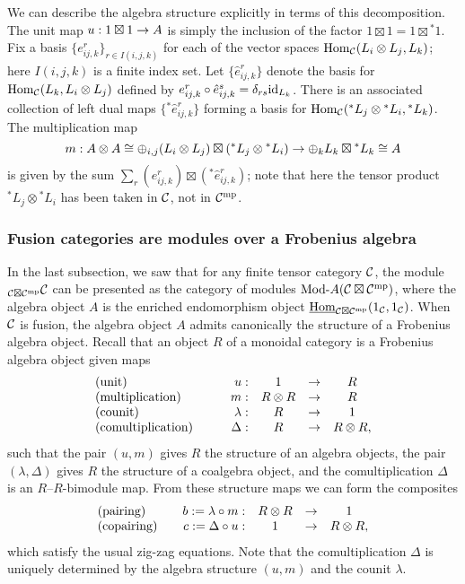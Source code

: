 \documentclass{amsart}
\begin{document}
We can describe the algebra structure explicitly in terms of this decomposition.  The unit map $u: 1 \boxtimes 1 \rightarrow A$ is simply the inclusion of the factor $1 \boxtimes 1 = 1 \boxtimes {}^*1$.  Fix a basis $\{e^r_{ij,k}\}_{r \in I(i,j,k)}$ for each of the vector spaces $\operatorname{Hom}_\mathcal C(L_i \otimes L_j,L_k)$; here $I(i,j,k)$ is a finite index set.  Let $\{\hat{e}^r_{ij,k}\}$ denote the basis for $\operatorname{Hom}_\mathcal C(L_k,L_i \otimes L_j)$ defined by $e^r_{ij,k} \circ \hat{e}^s_{ij,k} = \delta_{rs} \mathrm{id}_{L_k}$.  There is an associated collection of left dual maps $\{{}^*\hat{e}^r_{ij,k}\}$ forming a basis for $\operatorname{Hom}_\mathcal C({}^* L_j \otimes {}^* L_i, {}^* L_k)$.  The multiplication map
\[
m: A \otimes A \cong \oplus_{i,j} (L_i \otimes L_j) \boxtimes ({}^* L_j \otimes {}^* L_i) \rightarrow \oplus_k L_k \boxtimes {}^* L_k \cong A
\]
is given by the sum $\sum_r (e^r_{ij,k}) \boxtimes ({}^*\hat{e}^r_{ij,k})$; note that here the tensor product ${}^* L_j \otimes {}^* L_i$ has been taken in $\mathcal C$, not in $\mathcal C^{\mathrm{mp}}$.

\subsubsection{Fusion categories are modules over a Frobenius algebra}

In the last subsection, we saw that for any finite tensor category $\mathcal C$, the module ${}_{\mathcal C \boxtimes \mathcal C^{\mathrm{mp}}} \mathcal C$ can be presented as the category of modules $\Mod{}{A}(\cC \boxtimes \cC^\mp)$, where the algebra object $A$ is the enriched endomorphism object $\operatorname{\underline{Hom}}_{\mathcal C \boxtimes \mathcal C^{\mathrm{mp}}}(1_\mathcal C,1_\mathcal C)$.  When $\mathcal C$ is fusion, the algebra object $A$ admits canonically the structure of a Frobenius algebra object.  Recall that an object $R$ of a monoidal category is a Frobenius algebra object given maps
\begin{equation*}
	\begin{array}{l c  r c c c}
		\textrm{(unit)} & \quad & u: & 1 & \to & R \\
		\textrm{(multiplication)} && m: & R \otimes R & \to & R \\
		\textrm{(counit)} && \lambda: & R &\to &1 \\
		\textrm{(comultiplication)} && \Delta: & R &\to& R \otimes R,
	\end{array}
\end{equation*}
such that the pair $(u,m)$ gives $R$ the structure of an algebra objects, the pair $(\lambda, \Delta)$ gives $R$ the structure of a coalgebra object, and the comultiplication $\Delta$ is an $R$--$R$-bimodule map.  From these structure maps we can form the composites
\begin{equation*}
	\begin{array}{l c  r c c c}
		\textrm{(pairing)} && b := \lambda \circ m: & R \otimes R& \to& 1 \\
		\textrm{(copairing)} && c := \Delta \circ u: & 1&\to&  R \otimes R,
	\end{array}
\end{equation*}
which satisfy the usual zig-zag equations.  Note that the comultiplication $\Delta$ is uniquely determined by the algebra structure $(u,m)$ and the counit $\lambda$.
\end{document}
